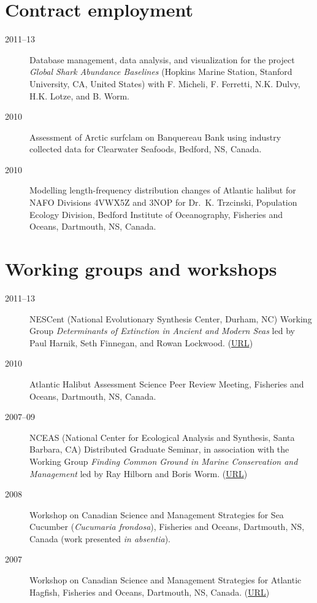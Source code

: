 \section{Contract employment}

\begin{description}
\item[2011--13]
Database management, data analysis, and visualization for the project
\emph{Global Shark Abundance Baselines} (Hopkins Marine Station,
Stanford University, CA, United States) with F. Micheli, F. Ferretti,
N.K. Dulvy, H.K. Lotze, and B. Worm.
\item[2010]
Assessment of Arctic surfclam on Banquereau Bank using industry
collected data for Clearwater Seafoods, Bedford, NS, Canada.
\item[2010]
Modelling length-frequency distribution changes of Atlantic halibut for
NAFO Divisions 4VWX5Z and 3NOP for Dr.\ K. Trzcinski, Population Ecology
Division, Bedford Institute of Oceanography, Fisheries and Oceans,
Dartmouth, NS, Canada.
\end{description}

\section{Working groups and workshops}

\begin{description}
\item[2011--13]
NESCent (National Evolutionary Synthesis Center, Durham, NC) Working
Group \emph{Determinants of Extinction in Ancient and Modern Seas} led
by Paul Harnik, Seth Finnegan, and Rowan Lockwood.
(\href{http://www.nescent.org/science/awards_summary.php?id=256}{URL})
\item[2010]
Atlantic Halibut Assessment Science Peer Review Meeting, Fisheries and
Oceans, Dartmouth, NS, Canada.
\item[2007--09]
NCEAS (National Center for Ecological Analysis and Synthesis, Santa
Barbara, CA) Distributed Graduate Seminar, in association with the
Working Group \emph{Finding Common Ground in Marine Conservation and
Management} led by Ray Hilborn and Boris Worm.
(\href{http://www.nceas.ucsb.edu/projects/12307}{URL})
\item[2008]
Workshop on Canadian Science and Management Strategies for Sea Cucumber
(\emph{Cucumaria frondosa}), Fisheries and Oceans, Dartmouth, NS, Canada
(work presented \emph{in absentia}).
\item[2007]
Workshop on Canadian Science and Management Strategies for Atlantic
Hagfish, Fisheries and Oceans, Dartmouth, NS, Canada.
(\href{http://www.dfo-mpo.gc.ca/CSAS/Csas/Publications/Pro-CR/2009/2009_009_e.htm}{URL})
\end{description}


